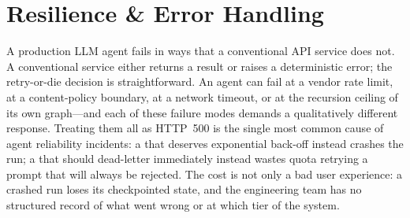 
\chapter{Resilience \& Error Handling}
\label{chap:resilience}

A production LLM agent fails in ways that a conventional API service does
not. A conventional service either returns a result or raises a
deterministic error; the retry-or-die decision is straightforward. An agent
can fail at a vendor rate limit, at a content-policy boundary, at a network
timeout, or at the recursion ceiling of its own graph---and each of these
failure modes demands a qualitatively different response. Treating them all
as HTTP~500 is the single most common cause of agent reliability incidents:
a  that deserves exponential back-off instead crashes
the run; a  that should dead-letter
immediately instead wastes quota retrying a prompt that will always be
rejected. The cost is not only a bad user experience: a crashed run loses
its checkpointed state, and the engineering team has no structured record of
what went wrong or at which tier of the system.

